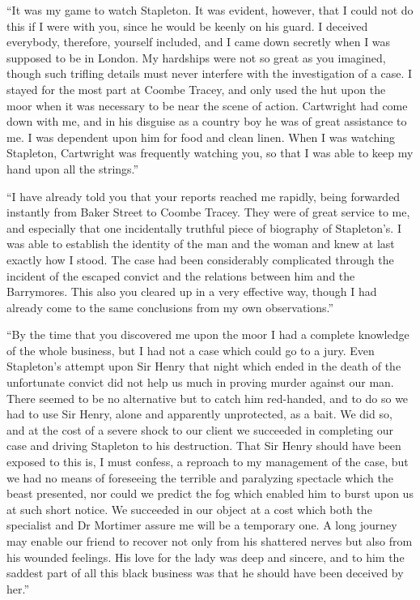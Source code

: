 \documentclass[paper=5.5in:8.5in,BCOR=7mm,twoside,DIV=calc,12pt,usegeometry,openany,chapterprefix,endperiod,headings=big]{scrbook} %
\begin{document}
\enquote{It was my game to watch Stapleton. It was evident, however, that I could not do this if I were with you, since he would be keenly on his guard. I deceived everybody, therefore, yourself included, and I came down secretly when I was supposed to be in London. My hardships were not so great as you imagined, though such trifling details must never interfere with the investigation of a case. I stayed for the most part at Coombe Tracey, and only used the hut upon the moor when it was necessary to be near the scene of action. Cartwright had come down with me, and in his disguise as a country boy he was of great assistance to me. I was dependent upon him for food and clean linen. When I was watching Stapleton, Cartwright was frequently watching you, so that I was able to keep my hand upon all the strings.}

\enquote{I have already told you that your reports reached me rapidly, being forwarded instantly from Baker Street to Coombe Tracey. They were of great service to me, and especially that one incidentally truthful piece of biography of Stapleton's. I was able to establish the identity of the man and the woman and knew at last exactly how I stood. The case had been considerably complicated through the incident of the escaped convict and the relations between him and the Barrymores. This also you cleared up in a very effective way, though I had already come to the same conclusions from my own observations.}

\enquote{By the time that you discovered me upon the moor I had a complete knowledge of the whole business, but I had not a case which could go to a jury. Even Stapleton's attempt upon Sir Henry that night which ended in the death of the unfortunate convict did not help us much in proving murder against our man. There seemed to be no alternative but to catch him red-handed, and to do so we had to use Sir Henry, alone and apparently unprotected, as a bait. We did so, and at the cost of a severe shock to our client we succeeded in completing our case and driving Stapleton to his destruction. That Sir Henry should have been exposed to this is, I must confess, a reproach to my management of the case, but we had no means of foreseeing the terrible and paralyzing spectacle which the beast presented, nor could we predict the fog which enabled him to burst upon us at such short notice. We succeeded in our object at a cost which both the specialist and Dr Mortimer assure me will be a temporary one. A long journey may enable our friend to recover not only from his shattered nerves but also from his wounded feelings. His love for the lady was deep and sincere, and to him the saddest part of all this black business was that he should have been deceived by her.}
\end{document}
